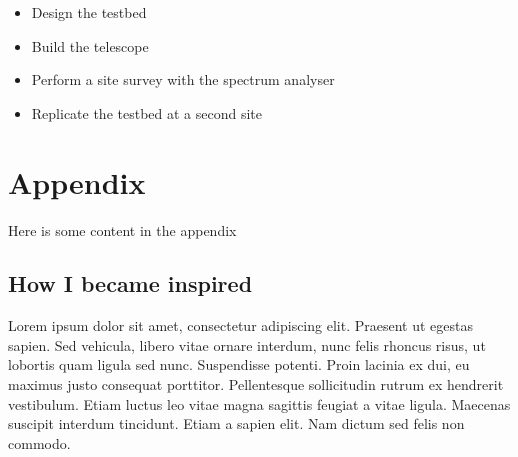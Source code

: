 \documentclass[runningheads,a4paper]{llncs}
\begin{document}
\begin{itemize}
  \item Design the testbed
  \item Build the telescope
  \item Perform a site survey with the spectrum analyser
  \item Replicate the testbed at a second site
\end{itemize}
%
\newpage
\listoftables
%
\printglossaries
%
%
\newpage


%
\newpage
%
\appendix
\section*{Appendix}
Here is some content in the appendix

\begin{subappendices}
\subsection*{How I became inspired}
Lorem ipsum dolor sit amet, consectetur adipiscing elit. Praesent ut egestas sapien. Sed vehicula, libero vitae ornare interdum, nunc felis rhoncus risus, ut lobortis quam ligula sed nunc. Suspendisse potenti. Proin lacinia ex dui, eu maximus justo consequat porttitor. Pellentesque sollicitudin rutrum ex hendrerit vestibulum. Etiam luctus leo vitae magna sagittis feugiat a vitae ligula. Maecenas suscipit interdum tincidunt. Etiam a sapien elit. Nam dictum sed felis non commodo.

%
\end{subappendices}
\end{document}
